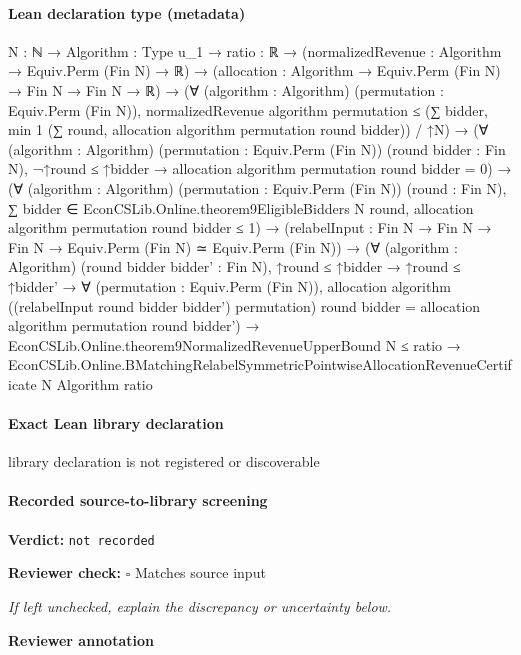 \documentclass[10pt]{article}
\newcommand{\reviewerbox}{%
  \par\noindent\fbox{\parbox{0.96\linewidth}{\rule{0pt}{0.38in}}}\par
}
\newcommand{\reviewmatch}[1]{%
  \par\noindent\textbf{Reviewer check:} $\square$\; #1\par
  \noindent\emph{If left unchecked, explain the discrepancy or uncertainty below.}\par
}
\begin{document}
\paragraph{Lean declaration type (metadata)}
\begin{ReviewVerbatim}
{N : ℕ} →
  {Algorithm : Type u_1} →
    {ratio : ℝ} →
      (normalizedRevenue : Algorithm → Equiv.Perm (Fin N) → ℝ) →
        (allocation : Algorithm → Equiv.Perm (Fin N) → Fin N → Fin N → ℝ) →
          (∀ (algorithm : Algorithm) (permutation : Equiv.Perm (Fin N)),
              normalizedRevenue algorithm permutation ≤
                (∑ bidder, min 1 (∑ round, allocation algorithm permutation round bidder)) / ↑N) →
            (∀ (algorithm : Algorithm) (permutation : Equiv.Perm (Fin N)) (round bidder : Fin N),
                ¬↑round ≤ ↑bidder → allocation algorithm permutation round bidder = 0) →
              (∀ (algorithm : Algorithm) (permutation : Equiv.Perm (Fin N)) (round : Fin N),
                  ∑ bidder ∈ EconCSLib.Online.theorem9EligibleBidders N round,
                      allocation algorithm permutation round bidder ≤
                    1) →
                (relabelInput : Fin N → Fin N → Fin N → Equiv.Perm (Fin N) ≃ Equiv.Perm (Fin N)) →
                  (∀ (algorithm : Algorithm) (round bidder bidder' : Fin N),
                      ↑round ≤ ↑bidder →
                        ↑round ≤ ↑bidder' →
                          ∀ (permutation : Equiv.Perm (Fin N)),
                            allocation algorithm ((relabelInput round bidder bidder') permutation) round bidder =
                              allocation algorithm permutation round bidder') →
                    EconCSLib.Online.theorem9NormalizedRevenueUpperBound N ≤ ratio →
                      EconCSLib.Online.BMatchingRelabelSymmetricPointwiseAllocationRevenueCertificate N Algorithm ratio
\end{ReviewVerbatim}

\paragraph{Exact Lean library declaration}
\begin{ReviewVerbatim}
library declaration is not registered or discoverable
\end{ReviewVerbatim}

\paragraph{Recorded source-to-library screening}
\textbf{Verdict:} \texttt{not recorded}
\reviewmatch{Matches source input}
\noindent\textbf{Reviewer annotation}\par
\reviewerbox
\clearpage
\hypertarget{library-prerequisite-f3043d6da81b30d0}{}
\end{document}
